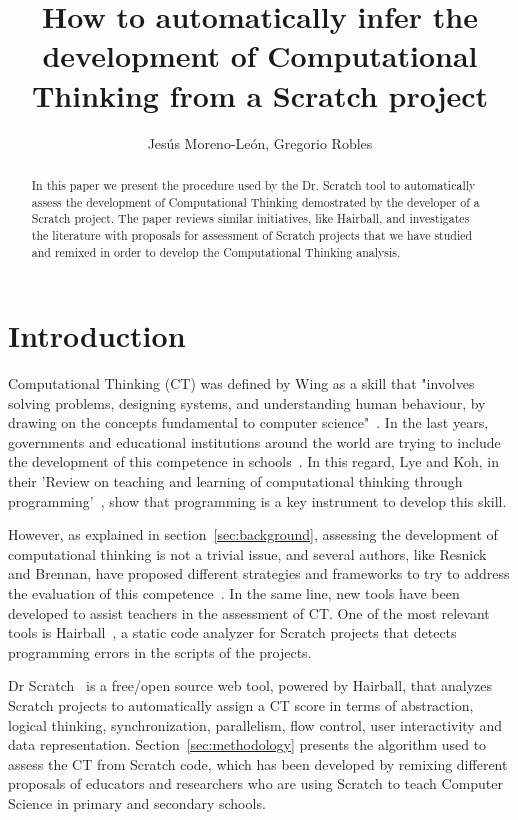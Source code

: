 \documentclass[a4paper,11pt]{article}
\title{How to automatically infer the development of Computational Thinking from a Scratch project}
\author{Jesús Moreno-León, Gregorio Robles}
\begin{document}
\maketitle

\begin{abstract}
In this paper we present the procedure used by the Dr. Scratch tool to automatically assess the development of Computational Thinking  demostrated by the developer of a Scratch project. The paper reviews similar initiatives, like Hairball, and investigates the literature with proposals for assessment of Scratch projects that we have studied and remixed in order to develop the Computational Thinking analysis.

\end{abstract}

\section{Introduction}
Computational Thinking (CT) was defined by Wing as a skill that "involves solving problems, designing systems, and understanding human behaviour, by drawing on the concepts fundamental to computer science"~\cite{wing2006computational}. In the last years, governments and educational institutions around the world are trying to include the development of this competence in schools~\cite{euschoolnet}. In this regard, Lye and Koh, in their 'Review on teaching and learning of computational thinking through programming'~\cite{lye2014review}, show that programming is a key instrument to develop this skill.

However, as explained in section~\ref{sec:background}, assessing the development of computational thinking is not a trivial issue, and several authors, like Resnick and Brennan, have proposed different strategies and frameworks to try to address the evaluation of this competence~\cite{brennan2012new}. In the same line, new tools have been developed to assist teachers in the assessment of CT. One of the most relevant tools is Hairball~\cite{boe2013hairball}, a static code analyzer for Scratch projects that detects programming errors in the scripts of the projects.

Dr Scratch~\cite{moreno2014drscratch} is a free/open source web tool, powered by Hairball, that analyzes Scratch projects to automatically assign a CT score in terms of abstraction, logical thinking, synchronization, parallelism, flow control, user interactivity and data representation. Section~\ref{sec:methodology} presents the algorithm used to assess the CT from Scratch code, which has been developed by remixing different proposals of educators and researchers who are using Scratch to teach Computer Science in primary and secondary schools.
\end{document}
